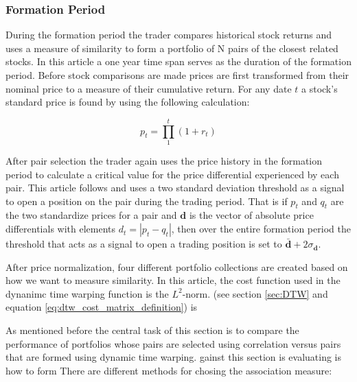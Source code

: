 \documentclass[12pt]{article}
\begin{document}
\subsubsection{Formation Period}

During the formation period the trader compares historical stock returns and uses a measure of similarity to form a portfolio of N pairs of the closest related stocks. In this article a one year time span serves as the duration of the formation period. Before stock comparisons are made prices are first transformed from their nominal price to a measure of their cumulative return. For any date $t$ a stock's standard price is found by using the following calculation:

\begin{equation} \label{eq:standard_price}
    p_{t} = \prod_{1}^{t} (1 + r_{t})
\end{equation}

After pair selection the trader again uses the price history in the formation period to calculate a critical value for the price differential experienced by each pair. This article follows \cite{Gatev_et_al_2006} and uses a two standard deviation threshold as a signal to open a position on the pair during the trading period. That is if $p_{t}$ and $q_{t}$ are the two standardize prices for a pair and $\boldsymbol{d}$ is the vector of absolute price differentials with elements $d_{t} = |p_{t} - q_{t}|$, then over the entire formation period the threshold that acts as a signal to open a trading position is set to $\boldsymbol{\bar{d}} + 2 \sigma_{\boldsymbol{d}}$.

After price normalization, four different portfolio collections are created based on how we want to measure similarity. In this article, the cost function used in the dynanimc time warping function is the $L^{2}$-norm. (see section \ref{sec:DTW} and equation \ref{eq:dtw_cost_matrix_definition}) is 


As mentioned before the central task of this section is to compare the performance of portfolios whose pairs are selected using correlation versus pairs that are formed using dynamic time warping. gainst  this section is evaluating is how to form There are different methods for chosing the association measure:
\end{document}
